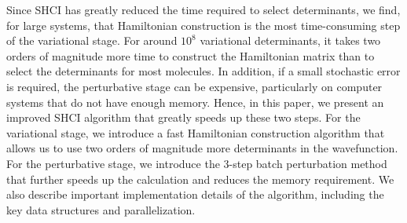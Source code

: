\documentclass[%
preprint,
 superscriptaddress,
 amsmath,amssymb,
 aps,
]{revtex4-1}
\begin{document}
Since SHCI has greatly reduced the time required to select determinants, we find, for large systems, that Hamiltonian construction is the
most time-consuming step of the variational stage.
For around $10^8$ variational determinants, it takes two orders of magnitude more time to construct the Hamiltonian matrix than to select the determinants for most molecules.
In addition, if a small stochastic error is required, the perturbative stage can be expensive,
particularly on computer systems that do not have enough memory.
Hence, in this paper, we present an improved SHCI algorithm that greatly speeds up these two steps.
For the variational stage, we introduce a fast Hamiltonian construction algorithm that allows us to use two orders of magnitude more determinants in the wavefunction.
For the perturbative stage, we introduce the 3-step batch perturbation method that further speeds up the calculation and reduces
the memory requirement.
We also describe important implementation details of the algorithm, including the key data structures and parallelization.
\end{document}
